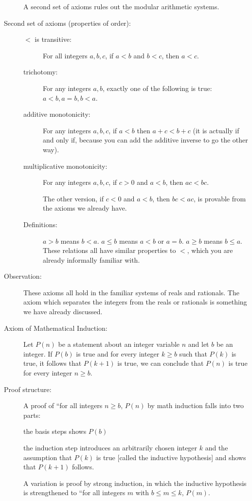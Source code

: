 \documentclass[12pt]{article}
\begin{document}
\begin{description}
A second set of axioms rules out the modular arithmetic systems.

\item[Second set of axioms (properties of order):]

\begin{description}

\item[$<$ is transitive:]  For all integers $a,b,c$, if $a<b$ and $b<c$, then $a<c$.

\item[trichotomy:]  For any integers $a,b$, exactly one of the following is true:  $a<b, a=b, b<a$.

\item[additive monotonicity:]  For any integers $a,b,c$, if $a<b$ then $a+c<b+c$ (it is actually if and only if, because you can add the additive inverse to go the other way).

\item[multiplicative monotonicity:]  For any integers $a,b,c$, if $c>0$ and $a<b$, then $ac<bc$.

The other version, if $c<0$ and $a<b$, then $bc<ac$, is provable from the axioms we already have.

\item[Definitions:]  $a>b$ means $b<a$.  $a \leq b$ means $a<b$ or $a=b$.  $a \geq b$ means $b \leq a$.
These relations all have similar properties to $<$, which you are already informally familiar with.

\end{description}

\item[Observation:]  These axioms all hold in the familiar systems of reals and rationals.  The axiom which separates
the integers from the reals or rationals is something we have already discussed.

\item[Axiom of Mathematical Induction:]  Let $P(n)$ be a statement about an integer variable $n$ and let
$b$ be an integer.  If $P(b)$ is true and for every integer $k \geq b$ such that $P(k)$ is true, it follows that $P(k+1)$ is true,
we can conclude that $P(n)$ is true for every integer $n \geq b$.

\item[Proof structure:]  A proof of ``for all integers $n \geq b$, $P(n)$ by math induction falls into two parts:

the basis steps shows $P(b)$

the induction step introduces an arbitrarily chosen integer $k$ and the assumption that $P(k)$ is true [called the inductive hypothesis] and shows that $P(k+1)$ follows.

A variation is proof by strong induction, in which the inductive hypothesis is strengthened to ``for all integers $m$ with $b \leq m \leq k$, $P(m)$.

\end{description}
\end{document}
